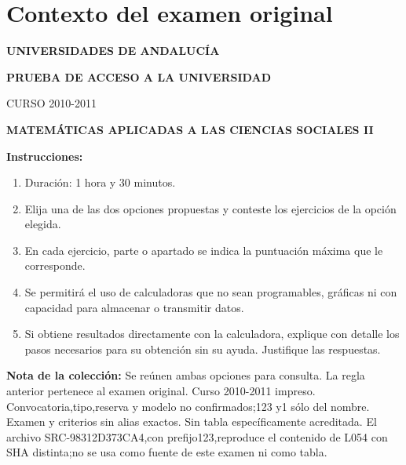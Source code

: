 \section*{Contexto del examen original}
\textbf{UNIVERSIDADES DE ANDALUCÍA}\par
\textbf{PRUEBA DE ACCESO A LA UNIVERSIDAD}\par
CURSO 2010-2011\par
\textbf{MATEMÁTICAS APLICADAS A LAS CIENCIAS SOCIALES II}

\textbf{Instrucciones:}
\begin{enumerate}[label=\textbf{\alph*)}]
  \item Duración: 1 hora y 30 minutos.
  \item Elija una de las dos opciones propuestas y conteste los ejercicios de la opción elegida.
  \item En cada ejercicio, parte o apartado se indica la puntuación máxima que le corresponde.
  \item Se permitirá el uso de calculadoras que no sean programables, gráficas ni con capacidad para almacenar o transmitir datos.
  \item Si obtiene resultados directamente con la calculadora, explique con detalle los pasos necesarios para su obtención sin su ayuda. Justifique las respuestas.
\end{enumerate}
\noindent\textbf{Nota de la colección:} Se reúnen ambas opciones para consulta. La regla anterior pertenece al examen original. Curso 2010-2011 impreso. Convocatoria,tipo,reserva y modelo no confirmados;123 y1 sólo del nombre. Examen y criterios sin alias exactos. Sin tabla específicamente acreditada. El archivo SRC-98312D373CA4,con prefijo123,reproduce el contenido de L054 con SHA distinta;no se usa como fuente de este examen ni como tabla.
\par\medskip
